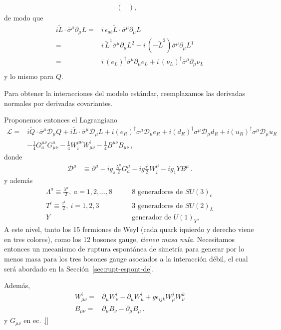\begin{frame}
\begin{align}
\begin{pmatrix}
  \end{pmatrix},&
\end{align}
de modo que
\begin{align*}
  i\widetilde{L}\cdot\overline{\sigma}^{\mu}\partial_{\mu}L=&
  i\,\epsilon_{ab}\widetilde{L}\cdot\overline{\sigma}^{\mu}\partial_{\mu}L \nonumber\\
 =&i\,\widetilde{L}^1\overline{\sigma}^{\mu}\partial_{\mu}L^2-i\,\left( -\widetilde{L}^2 \right)\overline{\sigma}^{\mu}\partial_{\mu}L^1    \nonumber\\
 =&i\,\left( e_L \right)^{\dagger}\overline{\sigma}^{\mu}\partial_{\mu}e_L+i\,\left( \nu_L \right)^{\dagger}\overline{\sigma}^{\mu}\partial_{\mu}\nu_L    \nonumber\\
\end{align*}
y lo mismo para $Q$.



Para obtener la interacciones del modelo estándar, reemplazamos las derivadas normales por derivadas covariantes.

Proponemos entonces el Lagrangiano
\begin{align}
\label{eq:L0}
     \mathcal{L}=&i\widetilde{Q}\cdot \overline{\sigma}^\mu\mathcal{D}_\mu Q+i\widetilde{L}\cdot \overline{\sigma}^\mu\mathcal{D}_\mu L+
i(e_R)^{\dagger}\sigma^\mu\mathcal{D}_\mu {e_R}+i(d_R)^{\dagger}\sigma^\mu\mathcal{D}_\mu d_R+i(u_R)^{\dagger}\sigma^\mu\mathcal{D}_\mu {u_R}
\nonumber\\
     &-\tfrac{1}{4}G^{\mu\nu}_a G_{\mu\nu}^a-\tfrac{1}{4}W^{\mu\nu}_i W_{\mu\nu}^i-\tfrac{1}{4}B^{\mu\nu} B_{\mu\nu}\,,
\end{align}
donde
\begin{align}
  \mathcal{D}^\mu&\equiv\partial^\mu-i g_s\frac{\lambda^a}{2}G^\mu_a-i g \frac{\tau^i}{2}W^\mu_i-i {g_1}YB^\mu\,.
\end{align}
y además
\begin{align*}
  \Lambda^a\equiv\frac{\lambda^a}{2},\ a=1,2,\ldots,8 &\qquad\text{8 generadores de $SU(3)_c$}\\
  T^i\equiv\frac{\tau^i}{2},\ i=1,2,3 &\qquad\text{3 generadores de $SU(2)_L$}\\
  Y &\qquad\text{generador de $U(1)_Y$},
\end{align*}
A este nivel, tanto los 15 fermiones de Weyl (cada quark iquierdo y derecho viene en tres colores), como los 12 bosones gauge, \emph{tienen masa nula}. Necesitamos entonces un mecanismo de ruptura espontánea de simetría para generar por lo menos masa para los tres bosones gauge asociados a la interacción débil, el cual será abordado en la Sección~\ref{sec:rupt-espont-de}.



\end{frame}
Además,
\begin{align}
  W_{\mu \nu}^i=&\partial_\mu W_\nu^i -\partial_\mu W_\mu^i+ g \epsilon_{ijk}W_\mu^j W_\nu^k \nonumber\\
  B_{\mu \nu}=&\partial_\mu B_\nu -\partial_\mu B_\mu\,.
\end{align}
y $G_{\mu\nu}$ en ec.~\eqref{}

